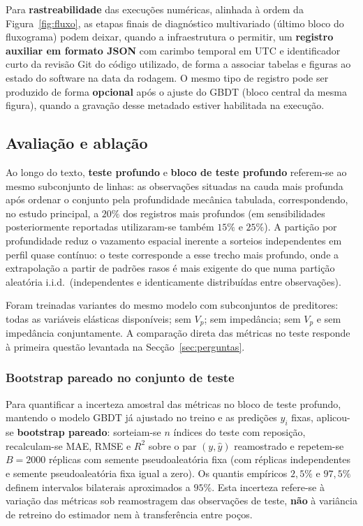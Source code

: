 \documentclass[12pt,a4paper]{article}
\begin{document}
Para \textbf{rastreabilidade} das execuções numéricas, alinhada à ordem da
Figura~\ref{fig:fluxo}, as etapas finais de diagnóstico multivariado (último bloco do
fluxograma) podem deixar, quando a infraestrutura o permitir, um \textbf{registro
auxiliar em formato JSON} com carimbo temporal em UTC e identificador curto da
revisão Git do código utilizado, de forma a associar tabelas e figuras ao estado do
software na data da rodagem. O mesmo tipo de registro pode ser produzido de forma
\textbf{opcional} após o ajuste do GBDT (bloco central da mesma figura), quando a
gravação desse metadado estiver habilitada na execução.

\subsection{Avaliação e ablação}\label{subsec:ablacao}
Ao longo do texto, \textbf{teste profundo} e \textbf{bloco de teste profundo} referem-se ao
mesmo subconjunto de linhas: as observações situadas na cauda mais profunda após
ordenar o conjunto pela profundidade mecânica tabulada, correspondendo,
no estudo principal, a \(20\%\) dos registros mais profundos (em sensibilidades
posteriormente reportadas utilizaram-se também \(15\%\) e \(25\%\)).
A partição por profundidade reduz o vazamento espacial inerente a sorteios
independentes em perfil quase contínuo: o teste corresponde a esse trecho mais
profundo, onde a extrapolação a partir de padrões
rasos é mais exigente do que numa partição aleatória i.i.d.\ (independentes
e identicamente distribuídas entre observações).

Foram treinadas variantes do mesmo modelo com subconjuntos de preditores: todas as
variáveis elásticas disponíveis; sem \(V_p\); sem impedância; sem \(V_p\) e
sem impedância conjuntamente. A comparação direta das métricas no teste
responde à primeira questão levantada na Secção~\ref{sec:perguntas}.

\subsubsection{Bootstrap pareado no conjunto de teste}\label{subsec:bootstrap_test}
Para quantificar a incerteza amostral das métricas no bloco de teste profundo,
mantendo o modelo GBDT já ajustado no treino e as predições \(\hat{y}_i\) fixas,
aplicou-se \textbf{bootstrap pareado}: sorteiam-se \(n\) índices do teste com
reposição, recalculam-se MAE, RMSE e \(R^2\) sobre o par \((y,\hat{y})\)
reamostrado e repetem-se \(B=2000\) réplicas com semente pseudoaleatória fixa
(com réplicas independentes e semente pseudoaleatória fixa igual a zero). Os quantis empíricos \(2{,}5\%\) e \(97{,}5\%\)
definem intervalos bilaterais aproximados a \(95\%\). Esta incerteza refere-se à
variação das métricas sob reamostragem das observações de teste, \textbf{não}
à variância de retreino do estimador nem à transferência entre poços.
\end{document}
